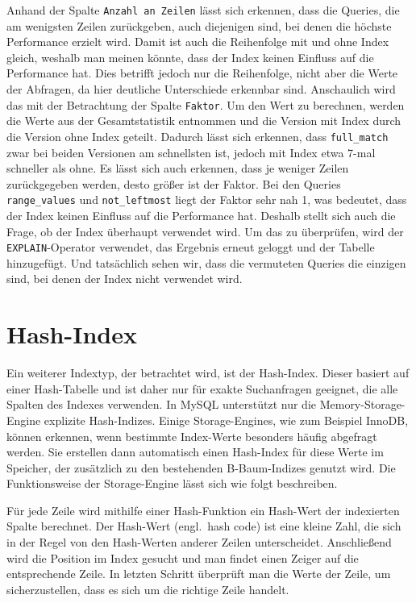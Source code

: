Anhand der Spalte \texttt{Anzahl an Zeilen} lässt sich erkennen, dass die Queries, die am wenigsten Zeilen zurückgeben, auch diejenigen sind, bei denen die höchste Performance erzielt wird.
Damit ist auch die Reihenfolge mit und ohne Index gleich, weshalb man meinen könnte, dass der Index keinen Einfluss auf die Performance hat.
Dies betrifft jedoch nur die Reihenfolge, nicht aber die Werte der Abfragen, da hier deutliche Unterschiede erkennbar sind.
Anschaulich wird das mit der Betrachtung der Spalte \texttt{Faktor}.
Um den Wert zu berechnen, werden die Werte aus der Gesamtstatistik entnommen und die Version mit Index durch die Version ohne Index geteilt.
Dadurch lässt sich erkennen, dass \texttt{full\_match} zwar bei beiden Versionen am schnellsten ist, jedoch mit Index etwa 7-mal schneller als ohne.
Es lässt sich auch erkennen, dass je weniger Zeilen zurückgegeben werden, desto größer ist der Faktor.
Bei den Queries \texttt{range\_values} und \texttt{not\_leftmost} liegt der Faktor sehr nah 1, was bedeutet, dass der Index keinen Einfluss auf die Performance hat.
Deshalb stellt sich auch die Frage, ob der Index überhaupt verwendet wird.
Um das zu überprüfen, wird der \texttt{EXPLAIN}-Operator verwendet, das Ergebnis erneut geloggt und der Tabelle hinzugefügt.
Und tatsächlich sehen wir, dass die vermuteten Queries die einzigen sind, bei denen der Index nicht verwendet wird.

\section{Hash-Index}\label{sec:indexing-hash-index}
Ein weiterer Indextyp, der betrachtet wird, ist der Hash-Index.
Dieser basiert auf einer Hash-Tabelle und ist daher nur für exakte Suchanfragen geeignet, die alle Spalten des Indexes verwenden.
In MySQL unterstützt nur die Memory-Storage-Engine explizite Hash-Indizes.
Einige Storage-Engines, wie zum Beispiel InnoDB, können erkennen, wenn bestimmte Index-Werte besonders häufig abgefragt werden.
Sie erstellen dann automatisch einen Hash-Index für diese Werte im Speicher, der zusätzlich zu den bestehenden B-Baum-Indizes genutzt wird.
Die Funktionsweise der Storage-Engine lässt sich wie folgt beschreiben.

Für jede Zeile wird mithilfe einer Hash-Funktion ein Hash-Wert der indexierten Spalte berechnet.
Der Hash-Wert (engl.\ hash code) ist eine kleine Zahl, die sich in der Regel von den Hash-Werten anderer Zeilen unterscheidet.
Anschließend wird die Position im Index gesucht und man findet einen Zeiger auf die entsprechende Zeile.
In letzten Schritt überprüft man die Werte der Zeile, um sicherzustellen, dass es sich um die richtige Zeile handelt.

